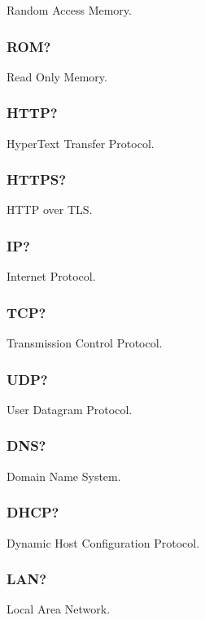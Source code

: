 Random Access Memory.

\subsubsection{ROM?}

Read Only Memory.

\subsubsection{HTTP?}

HyperText Transfer Protocol.

\subsubsection{HTTPS?}

HTTP over TLS.

\subsubsection{IP?}

Internet Protocol.

\subsubsection{TCP?}

Transmission Control Protocol.

\subsubsection{UDP?}

User Datagram Protocol.

\subsubsection{DNS?}

Domain Name System.

\subsubsection{DHCP?}

Dynamic Host Configuration Protocol.

\subsubsection{LAN?}

Local Area Network.

